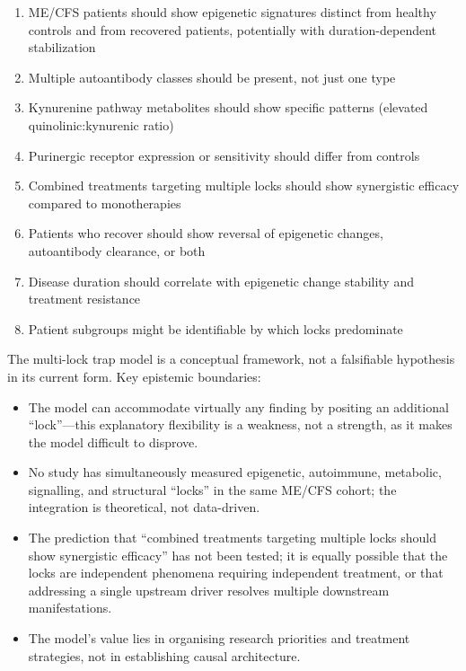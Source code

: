 \begin{enumerate}
    \item ME/CFS patients should show epigenetic signatures distinct from healthy controls and from recovered patients, potentially with duration-dependent stabilization
    \item Multiple autoantibody classes should be present, not just one type
    \item Kynurenine pathway metabolites should show specific patterns (elevated quinolinic:kynurenic ratio)
    \item Purinergic receptor expression or sensitivity should differ from controls
    \item Combined treatments targeting multiple locks should show synergistic efficacy compared to monotherapies
    \item Patients who recover should show reversal of epigenetic changes, autoantibody clearance, or both
    \item Disease duration should correlate with epigenetic change stability and treatment resistance
    \item Patient subgroups might be identifiable by which locks predominate
\end{enumerate}

\begin{limitation}
The multi-lock trap model is a conceptual framework, not a falsifiable hypothesis in its current form. Key epistemic boundaries:
\begin{itemize}
    \item The model can accommodate virtually any finding by positing an additional ``lock''---this explanatory flexibility is a weakness, not a strength, as it makes the model difficult to disprove.
    \item No study has simultaneously measured epigenetic, autoimmune, metabolic, signalling, and structural ``locks'' in the same ME/CFS cohort; the integration is theoretical, not data-driven.
    \item The prediction that ``combined treatments targeting multiple locks should show synergistic efficacy'' has not been tested; it is equally possible that the locks are independent phenomena requiring independent treatment, or that addressing a single upstream driver resolves multiple downstream manifestations.
    \item The model's value lies in organising research priorities and treatment strategies, not in establishing causal architecture.
\end{itemize}
\end{limitation}

